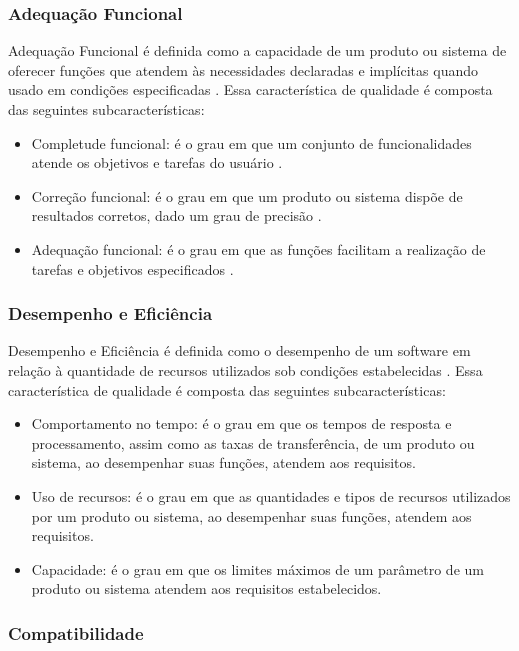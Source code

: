 \subsubsection{Adequação Funcional}

Adequação Funcional é definida como a capacidade de um produto ou sistema de oferecer funções que atendem às necessidades declaradas e implícitas quando usado em condições especificadas . Essa característica de qualidade é composta das seguintes subcaracterísticas:

\begin{itemize}
  \item Completude funcional: é o grau em que um conjunto de funcionalidades atende os objetivos e tarefas do usuário \cite{ISO/IEC25010}.
  \item Correção funcional: é o grau em que um produto ou sistema dispõe de resultados corretos, dado um grau de precisão .
  \item Adequação funcional: é o grau em que as funções facilitam a realização de tarefas e objetivos especificados .
\end{itemize}

\subsubsection{Desempenho e Eficiência}

Desempenho e Eficiência é definida como o desempenho de um software em relação à quantidade de recursos utilizados sob condições estabelecidas \cite{ISO/IEC25010}. Essa característica de qualidade é composta das seguintes subcaracterísticas:

\begin{itemize}
  \item Comportamento no tempo: é o grau em que os tempos de resposta e processamento, assim como as taxas de transferência, de um produto ou sistema, ao desempenhar suas funções, atendem aos requisitos.
  \item Uso de recursos: é o grau em que as quantidades e tipos de recursos utilizados por um produto ou sistema, ao desempenhar suas funções, atendem aos requisitos.
  \item Capacidade: é o grau em que os limites máximos de um parâmetro de um produto ou sistema atendem aos requisitos estabelecidos.
\end{itemize}

\subsubsection{Compatibilidade}

